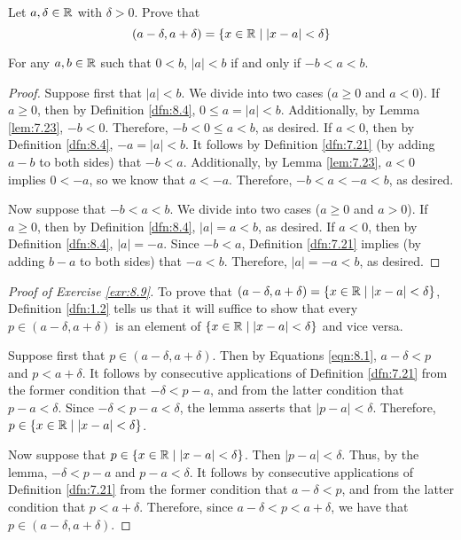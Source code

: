 \documentclass[../main.tex]{subfiles}
\begin{document}
\begin{exercise}\label{exr:8.9}
    Let $a,\delta\in\mathbb{R}$ with $\delta>0$. Prove that
    \begin{equation*}
        (a-\delta,a+\delta) = \{x\in\mathbb{R}\mid|x-a|<\delta\}
    \end{equation*}
    \begin{lemma*}
        For any $a,b\in\mathbb{R}$ such that $0<b$, $|a|<b$ if and only if $-b<a<b$.
        \begin{proof}
            Suppose first that $|a|<b$. We divide into two cases ($a\geq 0$ and $a<0$). If $a\geq 0$, then by Definition \ref{dfn:8.4}, $0\leq a=|a|<b$. Additionally, by Lemma \ref{lem:7.23}, $-b<0$. Therefore, $-b<0\leq a<b$, as desired. If $a<0$, then by Definition \ref{dfn:8.4}, $-a=|a|<b$. It follows by Definition \ref{dfn:7.21} (by adding $a-b$ to both sides) that $-b<a$. Additionally, by Lemma \ref{lem:7.23}, $a<0$ implies $0<-a$, so we know that $a<-a$. Therefore, $-b<a<-a<b$, as desired.\par
            Now suppose that $-b<a<b$. We divide into two cases ($a\geq 0$ and $a>0$). If $a\geq 0$, then by Definition \ref{dfn:8.4}, $|a|=a<b$, as desired. If $a<0$, then by Definition \ref{dfn:8.4}, $|a|=-a$. Since $-b<a$, Definition \ref{dfn:7.21} implies (by adding $b-a$ to both sides) that $-a<b$. Therefore, $|a|=-a<b$, as desired.
        \end{proof}
    \end{lemma*}
    \begin{proof}[Proof of Exercise \ref{exr:8.9}]
        To prove that $(a-\delta,a+\delta)=\{x\in\mathbb{R}\mid|x-a|<\delta\}$, Definition \ref{dfn:1.2} tells us that it will suffice to show that every $p\in(a-\delta,a+\delta)$ is an element of $\{x\in\mathbb{R}\mid|x-a|<\delta\}$ and vice versa.\par
        Suppose first that $p\in(a-\delta,a+\delta)$. Then by Equations \ref{eqn:8.1}, $a-\delta<p$ and $p<a+\delta$. It follows by consecutive applications of Definition \ref{dfn:7.21} from the former condition that $-\delta<p-a$, and from the latter condition that $p-a<\delta$. Since $-\delta<p-a<\delta$, the lemma asserts that $|p-a|<\delta$. Therefore, $p\in\{x\in\mathbb{R}\mid|x-a|<\delta\}$.\par
        Now suppose that $p\in\{x\in\mathbb{R}\mid|x-a|<\delta\}$. Then $|p-a|<\delta$. Thus, by the lemma, $-\delta<p-a$ and $p-a<\delta$. It follows by consecutive applications of Definition \ref{dfn:7.21} from the former condition that $a-\delta<p$, and from the latter condition that $p<a+\delta$. Therefore, since $a-\delta<p<a+\delta$, we have that $p\in(a-\delta,a+\delta)$.
    \end{proof}
\end{exercise}
\end{document}
